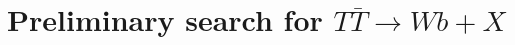 \clearpage{\pagestyle{empty}\cleardoublepage}

\chapter{Preliminary search for $T\bar{T}\to Wb+X$}\label{chap:wbx}
